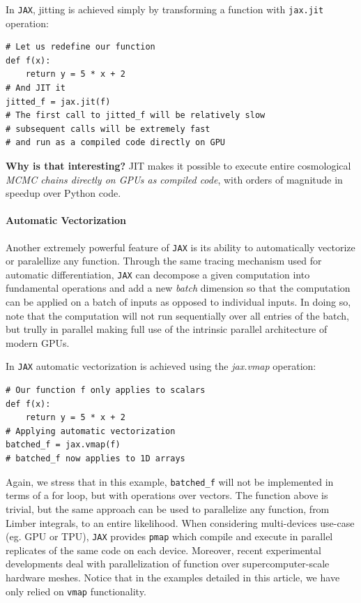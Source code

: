 \documentclass[twocolumn,twocolappendix,nofootinbib,iop]{openjournal}
\begin{document}
In \texttt{JAX}, jitting is achieved simply by transforming a function with \texttt{jax.jit} operation:
\begin{lstlisting}[language=iPython]
# Let us redefine our function
def f(x):
	return y = 5 * x + 2
# And JIT it
jitted_f = jax.jit(f)
# The first call to jitted_f will be relatively slow
# subsequent calls will be extremely fast
# and run as a compiled code directly on GPU
\end{lstlisting}

\textbf{Why is that interesting?} JIT makes it possible to execute entire cosmological \textit{MCMC chains directly on GPUs as compiled code}, with orders of magnitude in speedup over Python code.

\paragraph{\textbf{Automatic Vectorization}} Another extremely powerful feature of \texttt{JAX} is its ability to automatically vectorize or paralellize any function. Through the same tracing mechanism used for automatic differentiation, \texttt{JAX} can decompose a given computation into fundamental operations and add a new \textit{batch} dimension so that the computation can be applied on a batch of inputs as opposed to individual inputs. In doing so, note that the computation will not run sequentially over all entries of the batch, but trully in parallel making full use of the intrinsic parallel architecture of modern GPUs.

In \texttt{JAX} automatic vectorization is achieved using the \textit{jax.vmap} operation:
\begin{lstlisting}[language=iPython]
# Our function f only applies to scalars
def f(x):
	return y = 5 * x + 2
# Applying automatic vectorization
batched_f = jax.vmap(f)
# batched_f now applies to 1D arrays
\end{lstlisting}
Again, we stress that in this example, \texttt{batched\_f} will not be implemented in terms of a for loop, but with operations over vectors. The function above is trivial, but the same approach can be used to parallelize any function, from Limber integrals, to an entire likelihood. When considering multi-devices use-case (eg. GPU or TPU), \texttt{JAX} provides \texttt{pmap} which compile and execute in parallel replicates of the same code on each device. Moreover, recent experimental developments deal with parallelization of function over supercomputer-scale hardware meshes. Notice that in the examples detailed in this article, we have only relied on \texttt{vmap} functionality.
\end{document}
